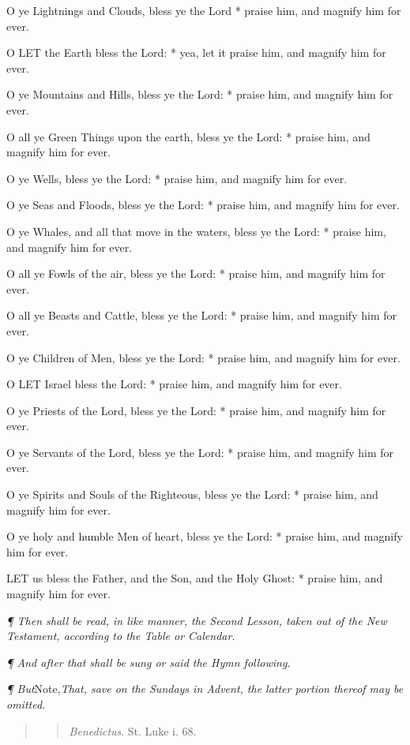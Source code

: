O ye Lightnings and Clouds, bless ye the Lord * praise
him, and magnify him for ever.

O
LET the Earth bless the Lord: * yea, let it praise him, and magnify him
for ever.

O ye Mountains and Hills, bless ye the Lord: * praise
him, and magnify him for ever.

O all ye Green Things upon the earth, bless ye the
Lord: * praise him, and magnify him for ever.

O ye Wells, bless ye the Lord: * praise him, and magnify
him for ever.

O ye Seas and Floods, bless ye the Lord: * praise him,
and magnify him for ever.

O ye Whales, and all that move in the waters, bless
ye the Lord: * praise him, and magnify him for ever.

O all ye Fowls of the air, bless ye the Lord: * praise
him, and magnify him for ever.

O all ye Beasts and Cattle, bless ye the Lord: * praise
him, and magnify him for ever.

O ye Children of Men, bless ye the Lord: * praise him,
and magnify him for ever.

O
LET Israel bless the Lord: * praise him, and magnify him for ever.

O ye Priests of the Lord, bless ye the Lord: * praise
him, and magnify him for ever.

O ye Servants of the Lord, bless ye the Lord: * praise
him, and magnify him for ever.

O ye Spirits and Souls of the Righteous, bless ye the
Lord: * praise him, and magnify him for ever.

O ye holy and humble Men of heart, bless ye the Lord:
* praise him, and magnify him for ever.

LET
us bless the Father, and the Son, and the Holy Ghost: * praise him, and
magnify him for ever.

\emph{¶
Then shall be read, in like manner, the Second Lesson, taken out of the New Testament, according
to the Table or Calendar.}

\emph{¶
And after that shall be sung or said the Hymn following.}

\emph{¶
But}Note,\emph{That, save on the Sundays in Advent, the latter portion thereof may be
omitted.}

\begin{quote}

\begin{quote}

\emph{Benedictus}.
St. Luke i. 68.

\end{quote}

\end{quote}

